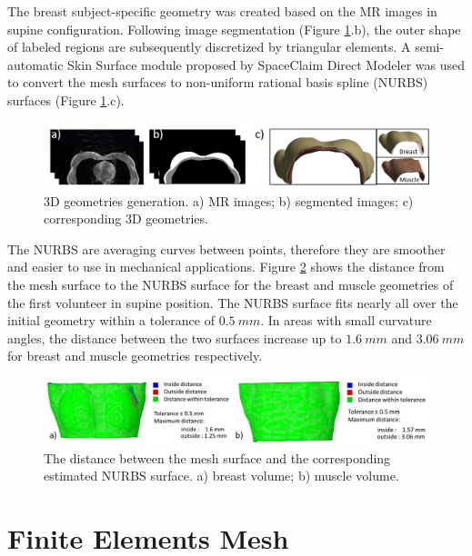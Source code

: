 The breast subject-specific geometry was created based on the MR images in supine configuration. Following image segmentation (Figure \ref{fig:3dgeometries}.b), the outer shape of labeled regions are subsequently discretized by triangular elements.  A semi-automatic Skin Surface module proposed by SpaceClaim Direct Modeler was used to convert the mesh surfaces to non-uniform rational basis spline (NURBS) surfaces (Figure \ref{fig:3dgeometries}.c). 

\begin{figure}[!h]
\centering
\includegraphics[width=\textwidth,keepaspectratio]{figures/3dgeometries.png} 
\caption{3D geometries generation. a) MR images; b) segmented images; c) corresponding 3D geometries.} \label{fig:3dgeometries}
\end{figure}

The NURBS are averaging curves between points, therefore they are smoother and easier to use in mechanical applications. Figure \ref{fig:nurbsVSsurfaceMeshError} shows the distance from the mesh surface to the NURBS surface for the breast and muscle geometries of the first volunteer in supine position. The NURBS surface fits nearly all over the initial geometry within a tolerance of $0.5\ mm$. In areas with small curvature angles, the distance between the two surfaces increase up to $1.6\ mm$ and $3.06\ mm$ for breast and muscle geometries respectively.
 
\begin{figure}[!h]
\centering
\includegraphics[width=\textwidth,keepaspectratio]{figures/nurbsVSsurfaceMeshError.jpg} 
\caption{The distance between the mesh surface and the corresponding estimated NURBS surface. a) breast volume; b) muscle volume.} \label{fig:nurbsVSsurfaceMeshError}
\end{figure}


\section{ Finite Elements Mesh}\label{section:myFEM}

